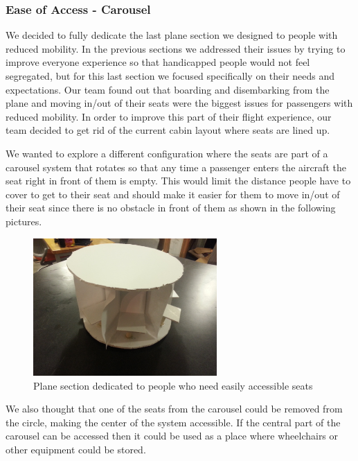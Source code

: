 \subsubsection{Ease of Access - Carousel}
We decided to fully dedicate the last plane section we designed to people with reduced mobility. In the previous sections we addressed their issues by trying to improve everyone experience so that handicapped people would not feel segregated, but for this last section we focused specifically on their needs and expectations. 
Our team found out that boarding and disembarking from the plane and moving in/out of their seats were the biggest issues for passengers with reduced mobility. In order to improve this part of their flight experience, our team decided to get rid of the current cabin layout where seats are lined up. 

We wanted to explore a different configuration where the seats are part of a carousel system that rotates so that any time a passenger enters the aircraft the seat right in front of them is empty. This would limit the distance people have to cover to get to their seat and should make it easier for them to move in/out of their seat since there is no obstacle in front of them as shown in the following pictures.

\begin{figure}[h]
  \centering
     \includegraphics[width=7cm]{images/20140116_172516.jpg}
   \caption{Plane section dedicated to people who need easily accessible seats}
  \label{fig:20140116_172516}
\end{figure}

We also thought that one of the seats from the carousel could be removed from the circle, making the center of the system accessible. If the central part of the carousel can be accessed then it could be used as a place where wheelchairs or other equipment could be stored.


